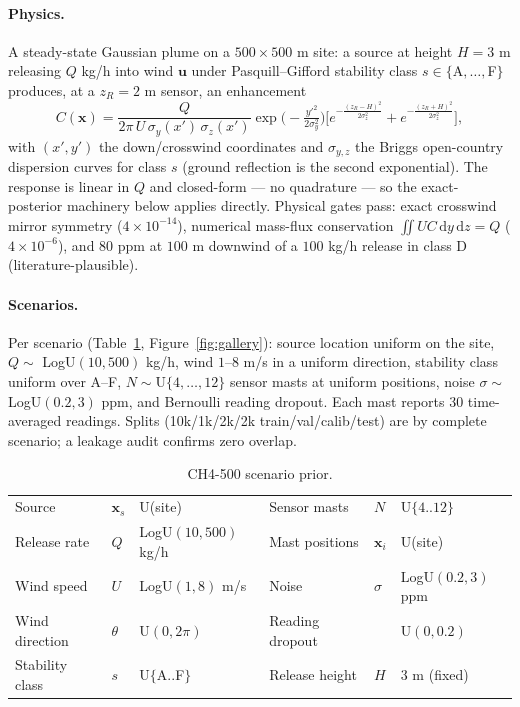 \documentclass{article}
\begin{document}
\paragraph{Physics.} A steady-state Gaussian plume on a $500 \times 500$ m site: a source
at height $H = 3$ m releasing $Q$ kg/h into wind $\boldsymbol{u}$ under Pasquill--Gifford
stability class $s \in \{$A$,\dots,$F$\}$ produces, at a $z_R = 2$ m sensor, an enhancement
\begin{equation}
C(\boldsymbol{x}) = \frac{Q}{2\pi\, U\, \sigma_y(x')\, \sigma_z(x')}
\exp\!\Big(\!-\tfrac{y'^2}{2\sigma_y^2}\Big)
\Big[e^{-\frac{(z_R-H)^2}{2\sigma_z^2}} + e^{-\frac{(z_R+H)^2}{2\sigma_z^2}}\Big],
\label{eq:plume}
\end{equation}
with $(x', y')$ the down/crosswind coordinates and $\sigma_{y,z}$ the Briggs open-country
dispersion curves for class $s$ (ground reflection is the second exponential). The response
is linear in $Q$ and closed-form --- no quadrature --- so the exact-posterior machinery
below applies directly. Physical gates pass: exact crosswind mirror symmetry
($4\times10^{-14}$), numerical mass-flux conservation $\iint U C\,\mathrm{d}y\,\mathrm{d}z
= Q$ ($4\times10^{-6}$), and $80$ ppm at $100$ m downwind of a $100$ kg/h release in class
D (literature-plausible).

\paragraph{Scenarios.} Per scenario (Table~\ref{tab:prior}, Figure~\ref{fig:gallery}):
source location uniform on the site, $Q \sim$ LogU$(10, 500)$ kg/h, wind $1$--$8$ m/s in a
uniform direction, stability class uniform over A--F, $N \sim$U$\{4,\dots,12\}$ sensor
masts at uniform positions, noise $\sigma \sim$LogU$(0.2, 3)$ ppm, and Bernoulli reading
dropout. Each mast reports 30 time-averaged readings. Splits (10k/1k/2k/2k
train/val/calib/test) are by complete scenario; a leakage audit confirms zero overlap.

\begin{table}[t]
  \caption{CH4-500 scenario prior.}
  \label{tab:prior}
  \centering
  \small
  \begin{tabular}{lll@{\qquad}lll}
    \toprule
    Source & $\boldsymbol{x}_s$ & U(site) &
    Sensor masts & $N$ & U$\{4..12\}$ \\
    Release rate & $Q$ & LogU$(10, 500)$ kg/h &
    Mast positions & $\boldsymbol{x}_i$ & U(site) \\
    Wind speed & $U$ & LogU$(1, 8)$ m/s &
    Noise & $\sigma$ & LogU$(0.2, 3)$ ppm \\
    Wind direction & $\theta$ & U$(0, 2\pi)$ &
    Reading dropout & & U$(0, 0.2)$ \\
    Stability class & $s$ & U$\{$A..F$\}$ &
    Release height & $H$ & $3$ m (fixed) \\
    \bottomrule
  \end{tabular}
\end{table}
\end{document}
